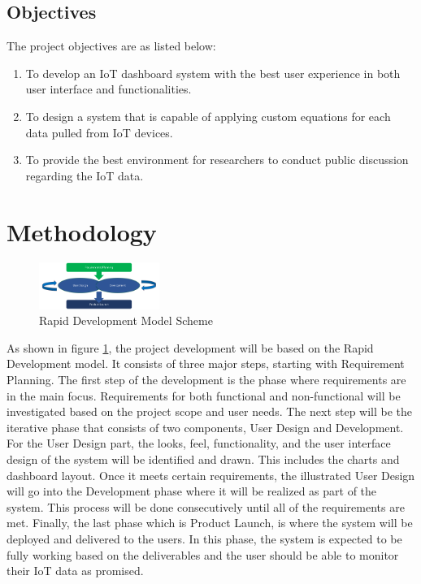 \documentclass[conference]{IEEEtran}
\begin{document}
\subsection{Objectives}
The project objectives are as listed below:
\begin{enumerate}
    \item To develop an IoT dashboard system with the best user experience in both user interface and functionalities.
    \item To design a system that is capable of applying custom equations for each data pulled from IoT devices.
    \item To provide the best environment for researchers to conduct public discussion regarding the IoT data.
\end{enumerate}

\section{Methodology}


\begin{figure}[h]
    \centering
    \includegraphics[width=0.35\textwidth]{rad}
    \caption{Rapid Development Model Scheme}
    \label{fig:rad}
\end{figure}

\FloatBarrier
As shown in figure \ref{fig:rad}, the project development will be based on the Rapid Development 
model. It consists of three major steps, starting with Requirement Planning. The first step 
of the development is the phase where requirements are in the main focus. Requirements for 
both functional and non-functional will be investigated based on the project scope and user 
needs. The next step will be the iterative phase that consists of two components, User Design 
and Development. For the User Design part, the looks, feel, functionality, and the user 
interface design of the system will be identified and drawn. This includes the charts and 
dashboard layout. Once it meets certain requirements, the illustrated User Design will go 
into the Development phase where it will be realized as part of the system. This process 
will be done consecutively until all of the requirements are met. Finally, the last phase 
which is Product Launch, is where the system will be deployed and delivered to the users. 
In this phase, the system is expected to be fully working based on the deliverables and the 
user should be able to monitor their IoT data as promised.
\end{document}
